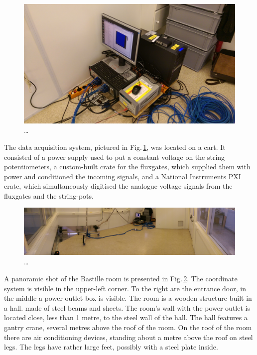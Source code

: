 \begin{figure}
  \centering
  \includegraphics[width=0.9\linewidth]{gfx/mapping/lpsc/daq.jpeg}
  \caption{\ldots}\label{fig:mapping_bastille_daq}
\end{figure}

The data acquisition system, pictured in Fig.\,\ref{fig:mapping_bastille_daq}, was located on a cart. It consisted of a power supply used to put a constant voltage on the string potentiometers, a custom-built crate for the fluxgates, which supplied them with power and conditioned the incoming signals, and a National Instruments PXI crate, which simultaneously digitised the analogue voltage signals from the fluxgates and the string-pots.

\begin{figure}
  \centering
  \includegraphics[width=\linewidth]{gfx/mapping/lpsc/bastille_panorama.jpeg}
  \caption{\ldots}\label{fig:mapping_bastille_panorama}
\end{figure}

A panoramic shot of the Bastille room is presented in Fig.\,\ref{fig:mapping_bastille_panorama}. The coordinate system is visible in the upper-left corner. To the right are the entrance door, in the middle a power outlet box is visible.
The room is a wooden structure built in a hall. made of steel beams and sheets. The room's wall with the power outlet is located close, less than 1 metre, to the steel wall of the hall. The hall features a gantry crane, several metres above the roof of the room. On the roof of the room there are air conditioning devices, standing about a metre above the roof on steel legs. The legs have rather large feet, possibly with a steel plate inside.

